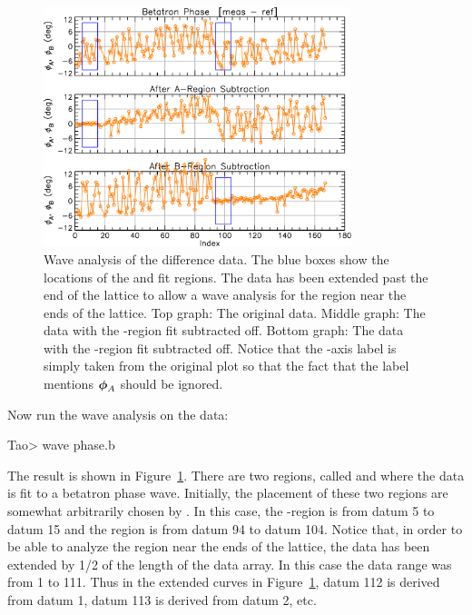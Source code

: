 \documentclass{hitec}     %
\begin{document}
\begin{figure}[tb]
  \centering
  \includegraphics[width=0.8\textwidth]{wave-anal.pdf}
  \caption{
Wave analysis of the  difference data. The blue boxes show the locations of the  and 
fit regions. The data has been extended past the end of the lattice to allow a wave analysis for the
region near the ends of the lattice. Top graph: The original data. Middle graph: The data with the
-region fit subtracted off. Bottom graph: The data with the -region fit subtracted
off. Notice that the -axis label is simply taken from the original plot so that the fact that
the label mentions $\boldsymbol{\phi}_A$ should be ignored.
  }
  \label{f:wave.anal}
\end{figure}

Now run the wave analysis on the  data:
\begin{code}
Tao> wave phase.b
\end{code}
The result is shown in Figure~\ref{f:wave.anal}. There are two regions, called  and 
where the data is fit to a betatron phase wave\cite{b:phase.coupling.correction}. Initially, the
placement of these two regions are somewhat arbitrarily chosen by \tao. In this case, the
-region is from datum 5 to datum 15 and the  region is from datum 94 to datum
104. Notice that, in order to be able to analyze the region near the ends of the lattice, the data
has been extended by 1/2 of the length of the data array. In this case the  data range
was from 1 to 111. Thus in the extended curves in Figure~\ref{f:wave.anal}, datum 112 is derived
from datum 1, datum 113 is derived from datum 2, etc.
\end{document}
